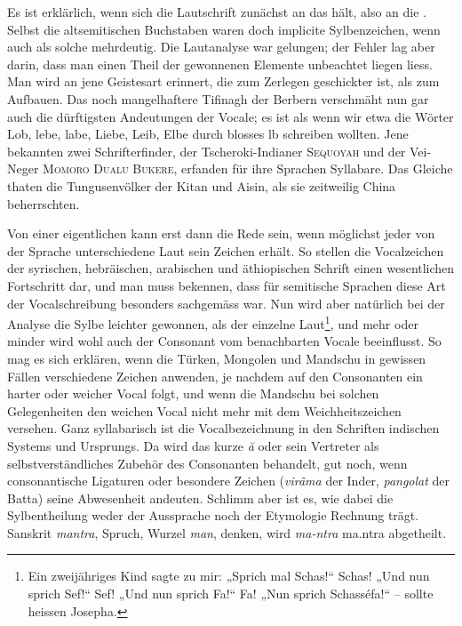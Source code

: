 Es ist erklärlich, wenn sich die Lautschrift zunächst an das  hält, also an die . Selbst die altsemitischen Buchstaben waren doch implicite Sylbenzeichen, wenn auch als solche mehrdeutig. Die Lautanalyse war gelungen; der Fehler lag aber darin, dass man einen Theil der gewonnenen Elemente unbeachtet liegen liess. Man wird an jene Geistesart erinnert, die zum Zerlegen geschickter ist, als zum Aufbauen. Das noch mangelhaftere Tifinagh der Berbern verschmäht nun gar auch die dürftigsten Andeutungen der Vocale; es ist als wenn wir \label{fp.140} etwa die Wörter Lob, lebe, labe, Liebe, Leib, Elbe durch blosses lb schreiben wollten. Jene bekannten zwei Schrifterfinder, der Tscheroki-Indianer \textsc{Sequoyah} und der Vei-Neger \textsc{Momoro Dualu Bukere}, erfanden für ihre Sprachen Syllabare. Das Gleiche thaten die Tungusenvölker der Kitan und Aisin, als sie zeitweilig China beherrschten.

Von einer eigentlichen  kann erst dann die Rede sein, wenn möglichst jeder von der Sprache unterschiedene Laut sein Zeichen erhält. So stellen die Vocalzeichen der syrischen, hebräischen, arabischen und äthiopischen Schrift einen wesentlichen Fortschritt dar, und man muss bekennen, dass für semitische Sprachen diese Art der Vocalschreibung besonders sachgemäss war. Nun wird aber natürlich bei der Analyse die Sylbe leichter gewonnen, als der einzelne Laut\footnote{Ein zweijähriges Kind sagte zu mir: „Sprich mal Schas!“ Schas! „Und nun sprich Sef!“ Sef! „Und nun sprich Fa!“ Fa! „Nun sprich Schasséfa!“ – sollte heissen Josepha.}, und mehr oder minder wird wohl auch der Consonant vom benachbarten Vocale beeinflusst. So mag es sich erklären, wenn die Türken, Mongolen und Mandschu in gewissen Fällen verschiedene Zeichen anwenden, je nachdem auf den Consonanten ein harter oder weicher Vocal folgt, und wenn die Mandschu bei solchen Gelegenheiten den weichen Vocal nicht mehr mit dem Weichheitszeichen versehen. Ganz syllabarisch ist die Vocalbezeichnung in den Schriften indischen Systems und Ursprungs. Da wird das kurze \textit{ă} oder sein Vertreter als selbstverständliches Zubehör des Consonanten behandelt, gut noch, wenn consonantische Ligaturen oder besondere Zeichen (\textit{virâma} der Inder, \textit{pangolat} der Batta) seine Abwesenheit andeuten. Schlimm aber ist es, wie dabei die Sylbentheilung weder der Aussprache noch der Etymologie Rechnung \label{sp.132} trägt. Sanskrit \textit{mantra}, Spruch, Wurzel \textit{man}, denken, wird \textit{ma-ntra} {\skt ma.ntra} abgetheilt.

